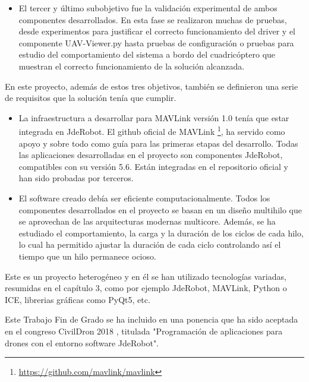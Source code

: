 \begin{itemize}
\item El tercer y último subobjetivo fue la validación experimental de ambos componentes desarrollados. En esta fase se realizaron muchas de pruebas, desde experimentos para justificar el correcto funcionamiento del driver y el componente UAV-Viewer.py hasta pruebas de configuración o pruebas para estudio del comportamiento del sistema a bordo del cuadricóptero que muestran el correcto funcionamiento de la solución alcanzada.

\end{itemize}

En este proyecto, además de estos tres objetivos, también se definieron una serie de requisitos que la solución tenía que cumplir.

\begin{itemize}
\item La infraestructura a desarrollar para MAVLink versión 1.0 tenía que estar integrada en JdeRobot. El github oficial de MAVLink \footnote{\url{https://github.com/mavlink/mavlink}}, ha servido como apoyo y sobre todo como guía para las primeras etapas del desarrollo. Todas las aplicaciones desarrolladas en el proyecto son componentes JdeRobot, compatibles con su versión 5.6. Están integradas en el repositorio oficial y han sido probadas por terceros.
\item El software creado debía ser eficiente computacionalmente. Todos los componentes desarrollados en el proyecto se basan en un diseño multihilo que se aprovechan de las arquitecturas modernas multicore. Además, se ha estudiado el comportamiento, la carga y la duración de los ciclos de cada hilo, lo cual ha permitido ajustar la duración de cada ciclo controlando así el tiempo que un hilo permanece ocioso.

\end{itemize}

Este es un proyecto heterogéneo y en él se han utilizado tecnologías variadas, resumidas en el capítulo 3, como por ejemplo JdeRobot, MAVLink, Python o ICE, librerias gráficas como PyQt5, etc.

Este Trabajo Fin de Grado se ha incluido en una ponencia que ha sido aceptada en el congreso CivilDron 2018 \cite{civilDron}, titulada "Programación de aplicaciones para drones con el entorno software JdeRobot". 

